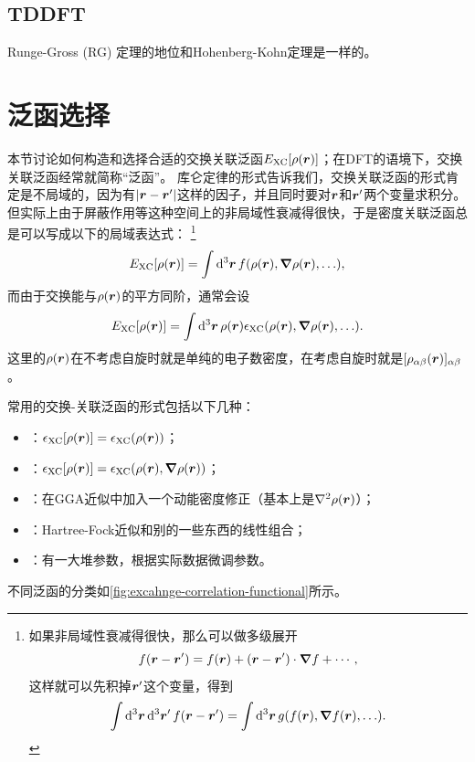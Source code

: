 \subsection{TDDFT}

Runge-Gross (RG) 定理的地位和Hohenberg-Kohn定理是一样的。

\section{泛函选择}

本节讨论如何构造和选择合适的交换关联泛函$E_\text{XC}[\rho(\vb*{r})]$；在DFT的语境下，交换关联泛函经常就简称“泛函”。
库仑定律的形式告诉我们，交换关联泛函的形式肯定是不局域的，因为有$\abs{\vb*{r} - \vb*{r}'}$这样的因子，并且同时要对$\vb*{r}$和$\vb*{r}'$两个变量求积分。
但实际上由于屏蔽作用等这种空间上的非局域性衰减得很快，于是密度关联泛函总是可以写成以下的局域表达式：%
\footnote{
    如果非局域性衰减得很快，那么可以做多级展开
    \[
        f(\vb*{r} - \vb*{r}') = f(\vb*{r}) + (\vb*{r} - \vb*{r}') \cdot \grad{f} + \cdots,
    \]
    这样就可以先积掉$\vb*{r}'$这个变量，得到
    \[
        \int \dd[3]{\vb*{r}} \dd[3]{\vb*{r}'} f(\vb*{r} - \vb*{r}') = \int \dd[3]{\vb*{r}} g(f(\vb*{r}), \grad{f(\vb*{r})}, \ldots).
    \]
}%
\[
    E_\text{XC}[\rho(\vb*{r})] = \int \dd[3]{\vb*{r}} f(\rho(\vb*{r}), \grad{\rho(\vb*{r})}, \ldots),
\]
而由于交换能与$\rho(\vb*{r})$的平方同阶，通常会设
\begin{equation}
    E_\text{XC}[\rho(\vb*{r})] = \int \dd[3]{\vb*{r}} \rho(\vb*{r}) \epsilon_\text{XC}(\rho(\vb*{r}), \grad{\rho(\vb*{r})}, \ldots).
\end{equation}
这里的$\rho(\vb*{r})$在不考虑自旋时就是单纯的电子数密度，在考虑自旋时就是$[\rho_{\alpha \beta}(\vb*{r})]_{\alpha \beta}$。

常用的交换-关联泛函的形式包括以下几种：
\begin{itemize}
    \item {}：$\epsilon_\text{XC}[\rho(\vb*{r})] = \epsilon_\text{XC}(\rho(\vb*{r}))$；
    \item {}：$\epsilon_\text{XC}[\rho(\vb*{r})] = \epsilon_\text{XC}(\rho(\vb*{r}), \grad{\rho(\vb*{r})})$；
    \item {}：在GGA近似中加入一个动能密度修正（基本上是$\laplacian \rho(\vb*{r})$）；
    \item {}：Hartree-Fock近似和别的一些东西的线性组合；
    \item {}：有一大堆参数，根据实际数据微调参数。
\end{itemize}
不同泛函的分类如\autoref{fig:excahnge-correlation-functional}所示。

